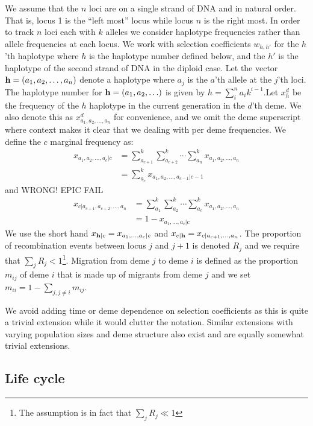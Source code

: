 \documentclass{article}
\begin{document}
We assume that the $n$ loci are on a single strand of DNA and in natural order.
That is, locus 1 is the ``left most'' locus while locus $n$ is the right most. In
order to track $n$ loci each with $k$ alleles we consider haplotype frequencies
rather than allele frequencies at each locus. We work with selection coefficients
$w_{h,h'}$ for the $h$'th  haplotype where  $h$ is the haplotype number defined
below, and the $h'$ is the haplotype of the second strand of DNA in the diploid
case. Let the vector $\mathbf{h}=(a_1,a_2,\ldots,a_n)$ denote a haplotype where $a_j$
is the $a$'th allele at the $j$'th loci. The haplotype number for
$\mathbf{h}=(a_1,a_2,\ldots)$ is given by $h=\sum_i^n a_ik^{i-1}$.Let $x^d_h$ be the
frequency of the $h$ haplotype in the current generation in the $d$'th deme. We
also denote this as $x^d_{a_1,a_2,\ldots,a_n}$ for convenience, and we omit the
deme superscript where context makes it clear that we dealing with per deme
frequencies. We define the $c$ marginal frequency as:
\begin{align}
	x_{a_1,a_2,\ldots,a_c|c}&=\sum_{a_{c+1}}^k\sum_{a_{c+2}}^k \cdots
	\sum_{a_n}^k x_{a_1,a_2,\ldots,a_n} \\
	&=\sum_{a_c}^k x_{a_1,a_2,\ldots,a_{c-1}|c-1}
\end{align}
and {\color{red} WRONG! EPIC FAIL}
\begin{align}
	x_{c|a_{c+1},a_{c+2},\ldots,a_n}&=\sum_{a_1}^k\sum_{a_2}^k \cdots
	\sum_{a_c}^k x_{a_1,a_2,\ldots,a_n} \\
	&=1-x_{a_1,\ldots,a_c|c} 
\end{align}
We use the short hand $x_{\mathbf{h}|c}=x_{a_1,\ldots,a_c|c}$ and
$x_{c|\mathbf{h}}=x_{c|a_{c+1},\ldots,a_n}$. The proportion of recombination events
between locus $j$ and $j+1$ is denoted $R_j$ and we require
that $\sum_j R_j<1$\footnote{The assumption is in fact that $\sum_j R_j\ll 1$}.
Migration from deme $j$ to deme $i$ is defined as the proportion $m_{ij}$ of
deme $i$ that is made  up of migrants from deme $j$ and  we set
$m_{ii}=1-\sum_{j,j \neq i} m_{ij}$. 

We avoid adding time or deme dependence on selection coefficients as this is quite
a trivial extension while it would clutter the notation. Similar extensions
with varying population sizes and deme structure also exist and are equally
somewhat trivial extensions.

\subsection{Life cycle}
\end{document}
